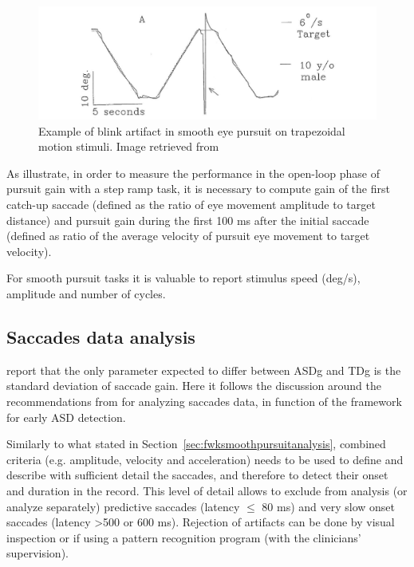 \begin{figure}[h]
  \centering
  \includegraphics[width=.7\textwidth]{figures/blink-06.jpg}
  \caption[Blink artifact]{Example of blink artifact in smooth eye pursuit on trapezoidal motion stimuli. Image retrieved from \cite{randal1993smooth}}
  \label{fig:blinkartifacts}
\end{figure}

As \cite{takarae2004smoothpursuit} illustrate, in order to measure the performance in the open-loop phase of pursuit gain with a step ramp task, it is necessary to compute gain of the first catch-up saccade (defined as the ratio of eye movement amplitude to target distance) and pursuit gain during the first 100 ms after the initial saccade (defined as ratio of the average velocity of pursuit eye movement to target velocity).

For smooth pursuit tasks it is valuable to report stimulus speed (deg/s), amplitude and number of cycles.



\subsection{Saccades data analysis}
\label{sec:fwksaccadesanalysis}

\cite{johnson2016review} report that the only parameter expected to differ between ASDg and TDg is the standard deviation of saccade gain.
Here it follows the discussion around the recommendations from \cite{smyrnis2008guidelines} for analyzing saccades data, in function of the framework for early ASD detection.

Similarly to what stated in Section~\ref{sec:fwksmoothpursuitanalysis}, combined criteria (e.g. amplitude, velocity and acceleration) needs to be used to define and describe with sufficient detail the saccades, and therefore to detect their onset and duration in the record. This level of detail allows to exclude from analysis (or analyze separately) predictive saccades (latency \(\leq\) 80 ms) and very slow onset saccades (latency \textgreater 500 or 600 ms). Rejection of artifacts can be done by visual inspection or if using a pattern recognition program (with the clinicians’ supervision).

